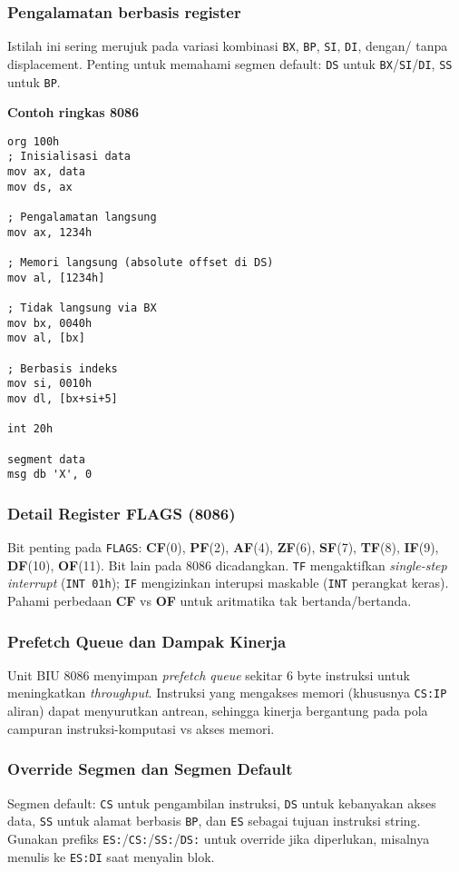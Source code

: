 \subsubsection{Pengalamatan berbasis register}
Istilah ini sering merujuk pada variasi kombinasi \texttt{BX}, \texttt{BP}, \texttt{SI}, \texttt{DI}, dengan/ tanpa displacement. Penting untuk memahami segmen default: \texttt{DS} untuk \texttt{BX}/\texttt{SI}/\texttt{DI}, \texttt{SS} untuk \texttt{BP}.

\noindent\textbf{Contoh ringkas 8086}
\begin{verbatim}
org 100h
; Inisialisasi data
mov ax, data
mov ds, ax

; Pengalamatan langsung
mov ax, 1234h

; Memori langsung (absolute offset di DS)
mov al, [1234h]

; Tidak langsung via BX
mov bx, 0040h
mov al, [bx]

; Berbasis indeks
mov si, 0010h
mov dl, [bx+si+5]

int 20h

segment data
msg db 'X', 0
\end{verbatim}
\subsubsection{Detail Register FLAGS (8086)}
Bit penting pada \texttt{FLAGS}: \textbf{CF}(0), \textbf{PF}(2), \textbf{AF}(4), \textbf{ZF}(6), \textbf{SF}(7), \textbf{TF}(8), \textbf{IF}(9), \textbf{DF}(10), \textbf{OF}(11). Bit lain pada 8086 dicadangkan. \texttt{TF} mengaktifkan \textit{single-step interrupt} (\texttt{INT 01h}); \texttt{IF} mengizinkan interupsi maskable (\texttt{INT} perangkat keras). Pahami perbedaan \textbf{CF} vs \textbf{OF} untuk aritmatika tak bertanda/bertanda. \cite{intel2019manual32,wiki_8086}

\subsubsection{Prefetch Queue dan Dampak Kinerja}
Unit BIU 8086 menyimpan \textit{prefetch queue} sekitar 6 byte instruksi untuk meningkatkan \textit{throughput}. Instruksi yang mengakses memori (khususnya \texttt{CS:IP} aliran) dapat menyurutkan antrean, sehingga kinerja bergantung pada pola campuran instruksi-komputasi vs akses memori. \cite{wiki_8086}

\subsubsection{Override Segmen dan Segmen Default}
Segmen default: \texttt{CS} untuk pengambilan instruksi, \texttt{DS} untuk kebanyakan akses data, \texttt{SS} untuk alamat berbasis \texttt{BP}, dan \texttt{ES} sebagai tujuan instruksi string. Gunakan prefiks \texttt{ES:}/\texttt{CS:}/\texttt{SS:}/\texttt{DS:} untuk override jika diperlukan, misalnya menulis ke \texttt{ES:DI} saat menyalin blok. \cite{intel2019manual32}

